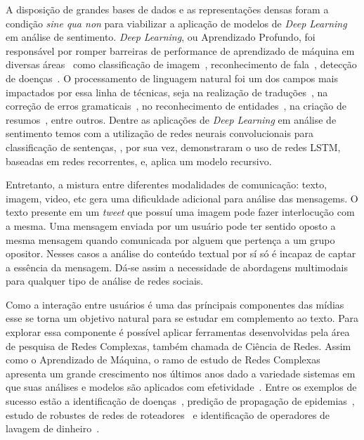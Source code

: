 A disposição de grandes bases de dados e as representações densas foram a
condição \textit{sine qua non} para viabilizar a aplicação de modelos de
\textit{Deep Learning} em análise de sentimento.
\textit{Deep Learning}, ou Aprendizado Profundo, foi responsável por romper
barreiras de performance de aprendizado de máquina em diversas
áreas~\cite{lecun15} como classificação de imagem~\cite{krizhevsky12},
reconhecimento de fala~\cite{hinton12a}, detecção de doenças~\cite{esteva17}.
O processamento de linguagem natural foi um dos campos mais impactados por essa
linha de técnicas, seja na realização de traduções~\cite{vaswani17},
na correção de erros gramaticais~\cite{ge18}, no reconhecimento de
entidades~\cite{akbik18}, na criação de resumos~\cite{wu18}, entre outros.
Dentre as aplicações de \textit{Deep Learning} em análise de sentimento
temos \citet{kim14} com a utilização de redes neurais convolucionais para
classificação de sentenças, \citet{zhou16}, por sua vez, demonstraram o uso de
redes LSTM, baseadas em redes recorrentes, e, \citet{socher13} aplica um modelo
recursivo.

Entretanto, a mistura entre diferentes modalidades de comunicação: texto, imagem,
video, etc gera uma dificuldade adicional para análise das mensagems.
O texto presente em um \textit{tweet} que possuí uma imagem pode fazer
interlocução com a mesma.
Uma mensagem enviada por um usuário pode ter sentido oposto a mesma mensagem
quando comunicada por alguem que pertença a um grupo opositor.
Nesses casos a análise do conteúdo textual por sí só é incapaz de captar a
essência da mensagem.
Dá-se assim a necessidade de abordagens multimodais para qualquer tipo de
análise de redes sociais.

Como a interação entre usuários é uma das príncipais componentes das mídias esse
se torna um objetivo natural para se estudar em complemento ao texto.
Para explorar essa componente é possível aplicar ferramentas desenvolvidas pela
área de pesquisa de Redes Complexas, também chamada de Ciência de Redes.
Assim como o Aprendizado de Máquina, o ramo de estudo de Redes Complexas
apresenta um grande crescimento nos últimos anos dado a variedade sistemas em
que suas análises e modelos são aplicados com efetividade~\cite{albert02}.
Entre os exemplos de sucesso estão a identificação de doenças~\cite{barabasi11},
predição de propagação de epidemias~\cite{hufnagel04}, estudo de robustes de
redes de roteadores~\cite{albert00} e identificação de operadores de lavagem de
dinheiro~\cite{colladon17}.

